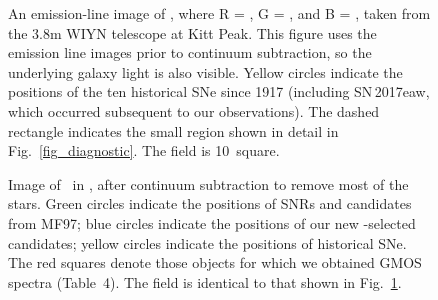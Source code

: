 % 


\pagebreak



\clearpage

\startlongtable

% 


\pagebreak
%


\begin{figure}
\caption{An emission-line image of \gal, where R = \ha, G = \sii, and B = \oiii, taken from the 3.8m WIYN telescope at Kitt Peak.  This figure uses the emission line images prior to continuum subtraction, so the underlying galaxy light is also visible. Yellow circles indicate the positions of the ten historical SNe since 1917 (including SN\,2017eaw, which occurred subsequent to our observations). The dashed rectangle indicates the small region shown in detail in Fig.~\ref{fig_diagnostic}.  The field is 10\arcmin\ square. 
\label{fig_rgb_overview}}
\end{figure}

\begin{figure}
\caption{Image of \gal\ in \ha, after continuum subtraction to remove most of the stars.  Green circles indicate the positions of SNRs and candidates from MF97; blue circles indicate the positions of our new \sii-selected candidates; yellow circles indicate the positions of historical SNe.  The red squares denote those objects for which we obtained GMOS spectra (Table~4).  The field is identical to that shown in Fig.~\ref{fig_rgb_overview}. \label{fig_index_overview}}
\end{figure}



